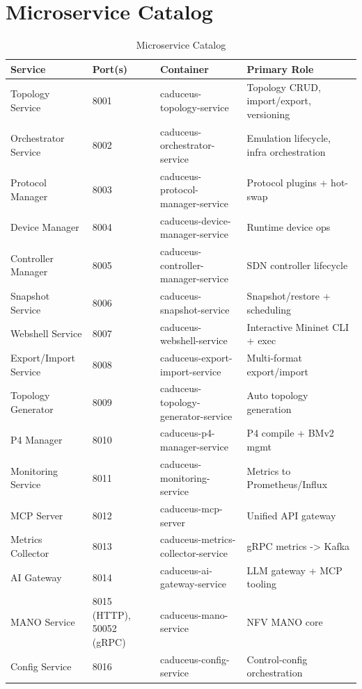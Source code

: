 \documentclass[conference]{IEEEtran}
\begin{document}
\section{Microservice Catalog}
\begin{table}[t]
\centering
\caption{Microservice Catalog}
\renewcommand{\arraystretch}{1.1}
\begin{tabularx}{\textwidth}{p{3.3cm}p{2.1cm}p{4.2cm}Y}
\toprule
\textbf{Service} & \textbf{Port(s)} & \textbf{Container} & \textbf{Primary Role} \\
\midrule
Topology Service & 8001 & caduceus-topology-service & Topology CRUD, import/export, versioning \\
Orchestrator Service & 8002 & caduceus-orchestrator-service & Emulation lifecycle, infra orchestration \\
Protocol Manager & 8003 & caduceus-protocol-manager-service & Protocol plugins + hot-swap \\
Device Manager & 8004 & caduceus-device-manager-service & Runtime device ops \\
Controller Manager & 8005 & caduceus-controller-manager-service & SDN controller lifecycle \\
Snapshot Service & 8006 & caduceus-snapshot-service & Snapshot/restore + scheduling \\
Webshell Service & 8007 & caduceus-webshell-service & Interactive Mininet CLI + exec \\
Export/Import Service & 8008 & caduceus-export-import-service & Multi-format export/import \\
Topology Generator & 8009 & caduceus-topology-generator-service & Auto topology generation \\
P4 Manager & 8010 & caduceus-p4-manager-service & P4 compile + BMv2 mgmt \\
Monitoring Service & 8011 & caduceus-monitoring-service & Metrics to Prometheus/Influx \\
MCP Server & 8012 & caduceus-mcp-server & Unified API gateway \\
Metrics Collector & 8013 & caduceus-metrics-collector-service & gRPC metrics -> Kafka \\
AI Gateway & 8014 & caduceus-ai-gateway-service & LLM gateway + MCP tooling \\
MANO Service & 8015 (HTTP), 50052 (gRPC) & caduceus-mano-service & NFV MANO core \\
Config Service & 8016 & caduceus-config-service & Control-config orchestration \\

\end{tabularx}
\end{table}
\end{document}
